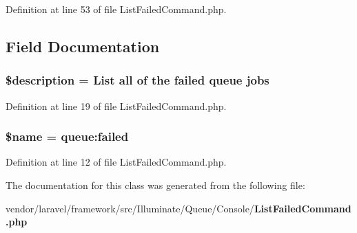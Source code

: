 Definition at line 53 of file List\+Failed\+Command.\+php.



\subsection{Field Documentation}
\subsubsection[{\$description}]{\setlength{\rightskip}{0pt plus 5cm}\$description = \textquotesingle{}List all of the failed {\bf queue} jobs\textquotesingle{}\hspace{0.3cm}{\ttfamily [protected]}}\label{class_illuminate_1_1_queue_1_1_console_1_1_list_failed_command_a87b032cba06009e3467abf1c8018d960}


Definition at line 19 of file List\+Failed\+Command.\+php.

\subsubsection[{\$name}]{\setlength{\rightskip}{0pt plus 5cm}\${\bf name} = \textquotesingle{}queue\+:failed\textquotesingle{}\hspace{0.3cm}{\ttfamily [protected]}}\label{class_illuminate_1_1_queue_1_1_console_1_1_list_failed_command_ab2fc40d43824ea3e1ce5d86dee0d763b}


Definition at line 12 of file List\+Failed\+Command.\+php.



The documentation for this class was generated from the following file\+:\begin{DoxyCompactItemize}
\item 
vendor/laravel/framework/src/\+Illuminate/\+Queue/\+Console/{\bf List\+Failed\+Command.\+php}\end{DoxyCompactItemize}
